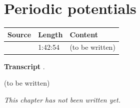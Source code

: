 \chapter{Periodic potentials}\label{ch:c40}
\begin{paracol}{2}

\begin{sources}
\begin{tabularx}{\linewidth}{@{}l l L@{}}
\toprule
\textbf{Source} & \textbf{Length} & \textbf{Content}\\
\midrule
{} & 1:42:54 & (to be written)\\
\bottomrule
\end{tabularx}

\smallskip
\textbf{Transcript} .
\end{sources}

\begin{reading}
(to be written)
\end{reading}

\emph{This chapter has not been written yet.}

\flushside
\end{paracol}
